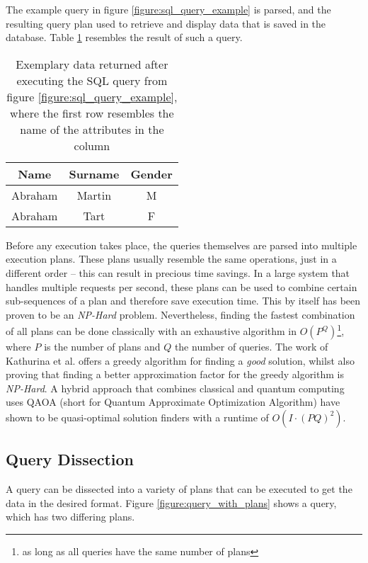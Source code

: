 The example query in figure \ref{figure:sql_query_example} is parsed, and the resulting query plan used to retrieve and display data that is saved in the database. Table \ref{table:sql_query_result_example} resembles the result of such a query.

\begin{table}[!h]
    \centering
    \begin{tabular}{|c|c|c|}
        \hline
        Name    & Surname & Gender \\ \hline
        Abraham & Martin  & M      \\ \hline
        Abraham & Tart    & F      \\ \hline
    \end{tabular}
    \caption{Exemplary data returned after executing the SQL query from figure \ref{figure:sql_query_example}, where the first row resembles the name of the attributes in the column}
    \label{table:sql_query_result_example}
\end{table}

Before any execution takes place, the queries themselves are parsed into multiple execution plans\cite{microsoft_execution_nodate}. These plans usually resemble the same operations, just in a different order – this can result in precious time savings. In a large system that handles multiple requests per second, these plans can be used to combine certain sub-sequences of a plan and therefore save execution time\cite{roy_multi-query_2009}. This by itself has been proven to be an \emph{NP-Hard} problem\cite{sellis_multiple-query_1990}. Nevertheless, finding the fastest combination of all plans can be done classically with an exhaustive algorithm in $O(P^Q)$\footnote{as long as all queries have the same number of plans}, where $P$ is the number of plans and $Q$ the number of queries. The work of Kathurina et al.\cite{kathuria_efficient_2017} offers a greedy algorithm for finding a \emph{good} solution, whilst also proving that finding a better approximation factor for the greedy algorithm is \emph{NP-Hard}. A hybrid approach that combines classical and quantum computing uses QAOA (short for Quantum Approximate Optimization Algorithm)\cite{farhi_quantum_2014} have shown to be quasi-optimal solution finders with a runtime of $O(I \cdot (PQ)^2)$\cite{fankhauser_multiple_2021}. \par

\subsection{Query Dissection}
A query can be dissected into a variety of plans that can be executed to get the data in the desired format. Figure \ref{figure:query_with_plans} shows a query, which has two differing plans.

